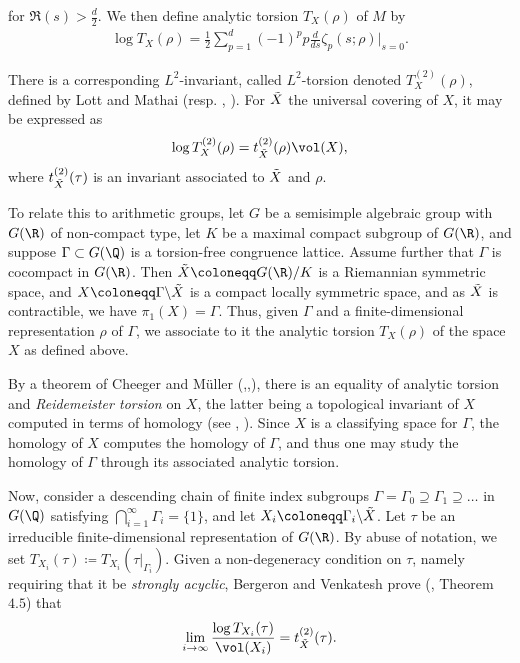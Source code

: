 \noindent for $\Re(s)>\frac{d}{2}$. We then define analytic torsion $T_X(\rho)$ of $M$ by
\begin{align}
    \log T_X(\rho) =\frac12 \sum_{p=1}^d (-1)^p p\frac{d}{ds}\zeta_p(s;\rho)\vert_{s=0}.
\end{align}

\noindent There is a corresponding $L^2$-invariant, called $L^2$-torsion denoted $T^{(2)}_X(\rho)$, defined by Lott and Mathai (resp. \cite{Lott}, \cite{Mathai}). For $\Tilde{X}$ the universal covering of $X$, it may be expressed as
\begin{align}\label{l2torsion}
    \log T^{(2)}_X(\rho) = t^{(2)}_{\Tilde{X}}(\rho)\vol(X),
\end{align}
where $t^{(2)}_{\Tilde{X}}(\tau)$ is an invariant associated to $\Tilde{X}$ and $\rho$.

To relate this to arithmetic groups, let $G$ be a semisimple algebraic group with $G(\R)$ of non-compact type, let $K$ be a maximal compact subgroup of $G(\R)$, and suppose $\Gamma\subset G(\Q)$ is a torsion-free congruence lattice. Assume further that $\Gamma$ is cocompact in $G(\R)$. Then $\Tilde{X}\coloneqq G(\R)/K$ is a Riemannian symmetric space, and $X\coloneqq \Gamma\backslash \Tilde{X}$ is a compact locally symmetric space, and as $\Tilde{X}$ is contractible, we have $\pi_1(X)=\Gamma$. Thus, given $\Gamma$ and a finite-dimensional representation $\rho$ of $\Gamma$, we associate to it the analytic torsion $T_X(\rho)$ of the space $X$ as defined above. 

By a theorem of Cheeger and Müller (\cite{Cheeger},\cite{Müller1},\cite{Müller2}), there is an equality of analytic torsion and \textit{Reidemeister torsion} on $X$, the latter being a topological invariant of $X$ computed in terms of homology (see \cite{Reidemeister}, \cite{Franz}). Since $X$ is a classifying space for $\Gamma$, the homology of $X$ computes the homology of $\Gamma$, and thus one may study the homology of $\Gamma$ through its associated analytic torsion.

Now, consider a descending chain of finite index subgroups $\Gamma=\Gamma_0\supseteq\Gamma_1\supseteq\dots$ in $G(\Q)$ satisfying $\bigcap_{i=1}^\infty\Gamma_i = \lbrace1\rbrace$, and let $X_i\coloneqq \Gamma_i\backslash \Tilde{X}$. Let $\tau$ be an irreducible finite-dimensional representation of $G(\R)$. By abuse of notation, we set $T_{X_i}(\tau)\coloneqq T_{X_i}(\tau|_{\Gamma_i})$. Given a non-degeneracy condition on $\tau$, namely requiring that it be \textit{strongly acyclic}, Bergeron and Venkatesh prove (\cite{BV}, Theorem $4.5$) that
\begin{align}\label{BVapprox}
    \lim_{i\to\infty} \frac{\log T_{X_i}(\tau)}{\vol(X_i)} = t^{(2)}_{\Tilde{X}}(\tau).
\end{align}


